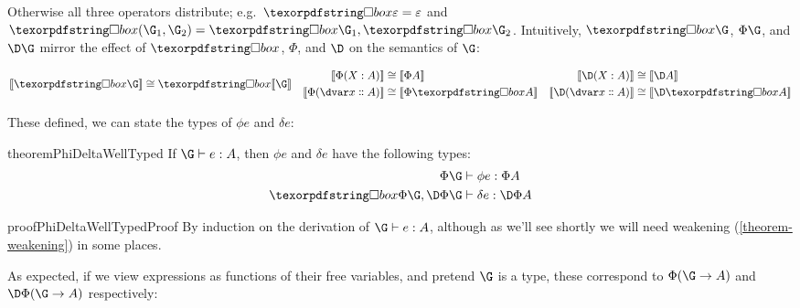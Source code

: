 \noindent
Otherwise all three operators distribute; e.g.\ $\iso\emptycx = \emptycx$ and
$\iso(\G_1,\G_2) = \iso\G_1, \iso\G_2$.
%
Intuitively, $\iso\G$, $\Phi\G$, and $\D\G$ mirror the effect of
$\iso$, $\Phi$, and $\D$ on the semantics of $\G$:

\begin{align*}
  \den{\iso\G} &\cong \iso\den\G
  &
  \begin{aligned}
    \den{\Phi(\hm x A)} &\cong \den{\Phi A}
    \\
    \den{\Phi(\hd x A)} &\cong \den{\Phi \iso A}
  \end{aligned}
  &&
  \begin{aligned}
    \den{\D(\hm x A)} &\cong \den{\D A}
    \\
    \den{\D(\hd x A)} &\cong \den{\D \iso A}
  \end{aligned}
\end{align*}


\noindent
These defined, we can state the types of $\phi e$ and $\delta e$:

\begin{restatable}{theorem}{PhiDeltaWellTyped}
  \label{theorem-phi-delta-well-typed}
  If\/ $\J e \G A$, then $\phi e$ and $\delta e$ have the following types:
  \begin{align*}
    \Jalign {\phi e} {\Phi\G} {\Phi A}\\
    \Jalign {\delta e} {\iso{\Phi\G}, \DP\G} {\DP A}
  \end{align*}
\end{restatable}

\begin{restatable}{proof}{PhiDeltaWellTypedProof}
  By induction on the derivation of $\J e \G A$, although as we'll see shortly
  we will need weakening (\cref{theorem-weakening}) in some places.
\end{restatable}

\noindent As expected, if we view expressions as functions of their free
variables, and pretend $\G$ is a type, these correspond to $\Phi(\G \to A)$
and $\DP(\G \to A)$ respectively:

